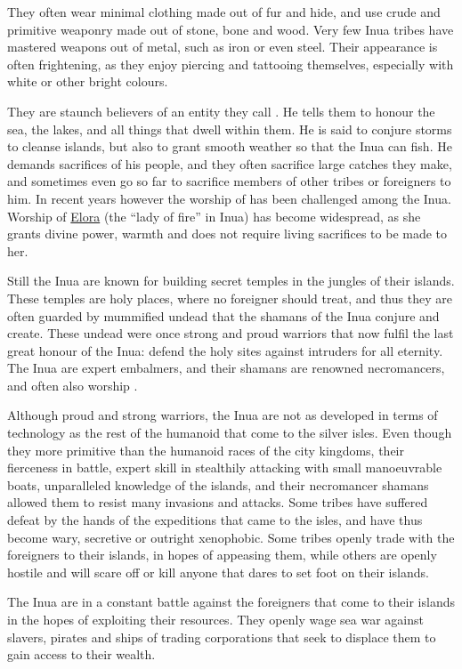They often wear minimal clothing made out of fur and hide, and use crude and
primitive weaponry made out of stone, bone and wood. Very few Inua tribes have
mastered weapons out of metal, such as iron or even steel. Their appearance is
often frightening, as they enjoy piercing and tattooing themselves, especially
with white or other bright colours.

They are staunch believers of an entity they call .
He tells them to honour the sea, the lakes, and all things that dwell within
them. He is said to conjure storms to cleanse islands, but also to grant
smooth weather so that the Inua can fish. He demands sacrifices of his people,
and they often sacrifice large catches they make, and sometimes even go so
far to sacrifice members of other tribes or foreigners to him. In recent years
however the worship of  has been challenged among the
Inua. Worship of \hyperref[sec:Forun]{Elora} (the ``lady of fire'' in Inua)
has become widespread, as she grants divine power, warmth and does not require
living sacrifices to be made to her.

Still the Inua are known for building secret temples in the jungles of their
islands. These temples are holy places, where no foreigner should treat, and
thus they are often guarded by mummified undead that the shamans of the Inua
conjure and create. These undead were once strong and proud warriors that
now fulfil the last great honour of the Inua: defend the holy sites against
intruders for all eternity. The Inua are expert embalmers, and their shamans
are renowned necromancers, and often also worship .

Although proud and strong warriors, the Inua are not as developed in terms of
technology as the rest of the humanoid that come to the silver isles.  Even
though they more primitive than the humanoid races of the city kingdoms, their
fierceness in battle, expert skill in stealthily attacking with small
manoeuvrable boats, unparalleled knowledge of the islands, and their
necromancer shamans allowed them to resist many invasions and attacks. Some
tribes have suffered defeat by the hands of the expeditions that came to the
isles, and have thus become wary, secretive or outright xenophobic. Some
tribes openly trade with the foreigners to their islands, in hopes of
appeasing them, while others are openly hostile and will scare off or kill
anyone that dares to set foot on their islands.

The Inua are in a constant battle against the foreigners that come to their
islands in the hopes of exploiting their resources. They openly wage sea
war against slavers, pirates and ships of trading corporations that seek
to displace them to gain access to their wealth.
